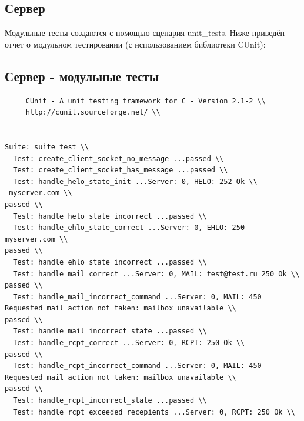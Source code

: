 \documentclass[a4paper,12pt]{report}
\begin{document}
\subsection*{Сервер}
Модульные тесты создаются с помощью сценария unit\_tests. Ниже приведён отчет о модульном тестировании (с использованием библиотеки CUnit):
\subsection*{Сервер - модульные тесты}
\begin{verbatim}
     CUnit - A unit testing framework for C - Version 2.1-2 \\
     http://cunit.sourceforge.net/ \\


Suite: suite_test \\
  Test: create_client_socket_no_message ...passed \\
  Test: create_client_socket_has_message ...passed \\
  Test: handle_helo_state_init ...Server: 0, HELO: 252 Ok \\
 myserver.com \\
passed \\
  Test: handle_helo_state_incorrect ...passed \\
  Test: handle_ehlo_state_correct ...Server: 0, EHLO: 250- myserver.com \\
passed \\
  Test: handle_ehlo_state_incorrect ...passed \\
  Test: handle_mail_correct ...Server: 0, MAIL: test@test.ru 250 Ok \\
passed \\
  Test: handle_mail_incorrect_command ...Server: 0, MAIL: 450 Requested mail action not taken: mailbox unavailable \\
passed \\
  Test: handle_mail_incorrect_state ...passed \\
  Test: handle_rcpt_correct ...Server: 0, RCPT: 250 Ok \\
passed \\
  Test: handle_rcpt_incorrect_command ...Server: 0, MAIL: 450 Requested mail action not taken: mailbox unavailable \\
passed \\
  Test: handle_rcpt_incorrect_state ...passed \\
  Test: handle_rcpt_exceeded_recepients ...Server: 0, RCPT: 250 Ok \\

\end{verbatim}
\end{document}
